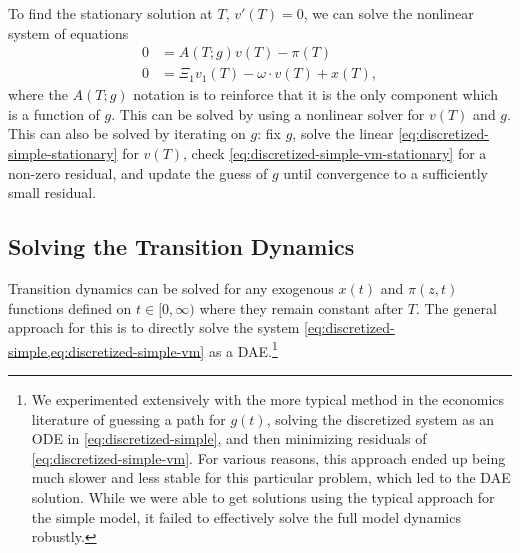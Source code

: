 \documentclass[11pt]{article}
\begin{document}
\noindent To find the stationary solution at $T$,  $v'(T) = 0$, we can solve the nonlinear system of equations
\begin{align}
	0 &= A(T; g) v(T) - \pi(T)\label{eq:discretized-simple-stationary}\\
	0 &= \Xi_1 v_1(T) - \omega \cdot v(T) + x(T) , \label{eq:discretized-simple-vm-stationary}
\end{align}
where the $ A(T; g)$ notation is to reinforce that it is the only component which is a function of $g$. This can be solved by using a nonlinear solver for $v(T)$ and $g$. This can also be solved by iterating on $g$: fix $g$, solve the linear \cref{eq:discretized-simple-stationary} for $v(T)$, check \cref{eq:discretized-simple-vm-stationary} for a non-zero residual, and update the guess of $g$ until convergence to a sufficiently small residual.

\subsection{Solving the Transition Dynamics}

Transition dynamics can be solved for any exogenous $x(t)$ and $\pi(z,t)$ functions defined on $t \in [0,\infty)$ where they remain constant after $T$.  The general approach  for this is to directly solve the system \cref{eq:discretized-simple,eq:discretized-simple-vm} as a DAE.\footnote{ We experimented extensively with the more typical method in the economics literature of guessing a path for $g(t)$, solving the discretized system as an ODE in \cref{eq:discretized-simple}, and then minimizing residuals of \cref{eq:discretized-simple-vm}.  For various reasons, this approach ended up being much slower and less stable for this particular problem, which led to the DAE solution.  While we were able to get solutions using the typical approach for the simple model, it failed to effectively solve the full model dynamics robustly.}
\end{document}
